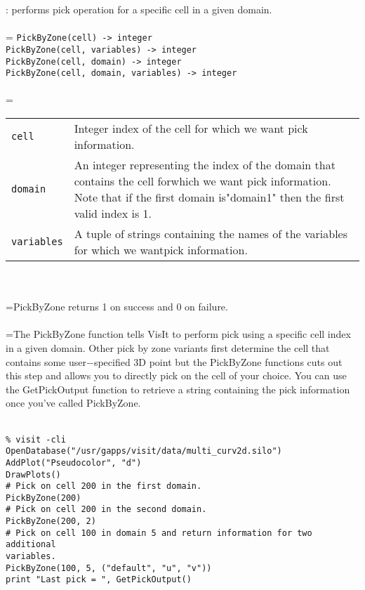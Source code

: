 \documentclass[10pt,a4paper]{report}
\begin{document}
{}
: performs pick operation for a specific cell in a given domain.\\[-3mm]

 \\ 
\hangindent=\parindent 
\verb!PickByZone(cell) -> integer!\\ 
\verb!PickByZone(cell, variables) -> integer!\\ 
\verb!PickByZone(cell, domain) -> integer!\\ 
\verb!PickByZone(cell, domain, variables) -> integer!\\ [-3mm]

 \\ 
\hangindent=\parindent 
\begin{tabular}{lp{9cm}}
\verb!cell! & Integer index of the cell for which we want pick information. \\
\verb!domain! & An integer representing the index of the domain that contains the cell forwhich we want pick information. Note that if the first domain is"domain1" then the first valid index is 1. \\
\verb!variables! & A tuple of strings containing the names of the variables for which we wantpick information. \\
\end{tabular} \\[-2mm]


 \\ 
\hangindent=\parindent PickByZone returns 1 on success and 0 on failure. \\[-3mm] 

 \\ 
\hangindent=\parindent The PickByZone function tells VisIt to perform pick using a specific cell index in a given domain. Other pick by zone variants first determine the cell that contains some user$-$specified 3D point but the PickByZone functions cuts out this step and allows you to directly pick on the cell of your choice. You can use the GetPickOutput function to retrieve a string containing the pick information once you've called PickByZone. \\[-3mm] 

\\[-6mm]
\begin{verbatim}% visit -cli
OpenDatabase("/usr/gapps/visit/data/multi_curv2d.silo")
AddPlot("Pseudocolor", "d")
DrawPlots()
# Pick on cell 200 in the first domain.
PickByZone(200)
# Pick on cell 200 in the second domain.
PickByZone(200, 2)
# Pick on cell 100 in domain 5 and return information for two additional
variables.
PickByZone(100, 5, ("default", "u", "v"))
print "Last pick = ", GetPickOutput()
\end{verbatim}
\newpage
\end{document}
